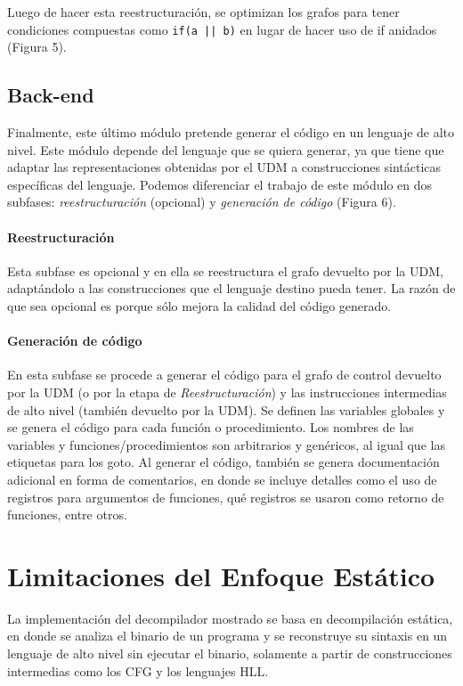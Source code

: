 \documentclass[runningheads]{llncs}
\begin{document}
Luego de hacer esta reestructuración, se optimizan los grafos para tener condiciones compuestas 
como \verb+if(a || b)+ en lugar de hacer uso de if anidados (Figura 5).

\subsection{Back-end}
Finalmente, este último módulo pretende generar el código en un lenguaje de alto nivel. 
Este módulo depende del lenguaje que se quiera generar, ya que tiene que adaptar las representaciones 
obtenidas por el UDM a construcciones sintácticas específicas del lenguaje. Podemos diferenciar 
el trabajo de este módulo en dos subfases: \textit{reestructuración} (opcional) y 
\textit{generación de código} (Figura 6).

\paragraph{Reestructuración} Esta subfase es opcional y en ella se reestructura el grafo devuelto por 
la UDM, adaptándolo a las construcciones que el lenguaje destino pueda tener. La razón de que sea 
opcional es porque sólo mejora la calidad del código generado.

\paragraph{Generación de código} En esta subfase se procede a generar el código para el grafo de 
control devuelto por la UDM (o por la etapa de \textit{Reestructuración}) y las instrucciones 
intermedias de alto nivel (también devuelto por la UDM). Se definen las variables globales y se 
genera el código para cada función o procedimiento. Los nombres de las variables y 
funciones/procedimientos son arbitrarios y genéricos, al igual que las etiquetas para los goto.
Al generar el código, también se genera documentación adicional en forma de comentarios, 
en donde se incluye detalles como el uso de registros para argumentos de funciones, qué registros 
se usaron como retorno de funciones, entre otros.

\section{Limitaciones del Enfoque Estático}
La implementación del decompilador mostrado se basa en decompilación estática, en donde se analiza 
el binario de un programa y se reconstruye su sintaxis en un lenguaje de alto nivel sin ejecutar el 
binario, solamente a partir de construcciones intermedias como los CFG y los lenguajes HLL.
\end{document}
